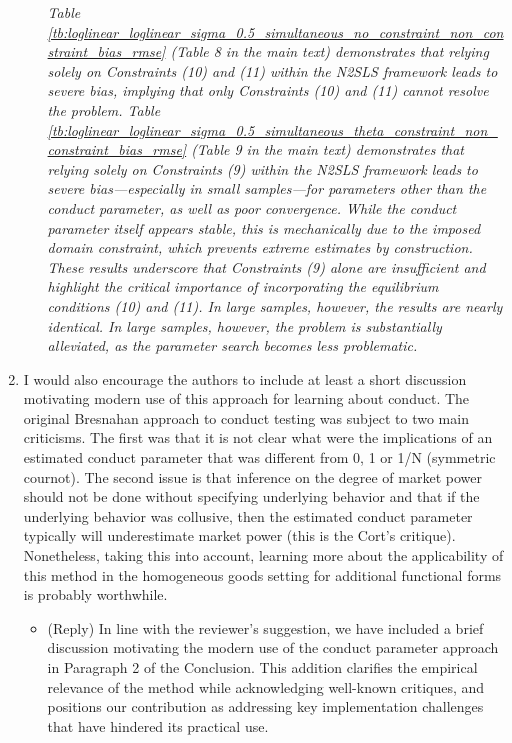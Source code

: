 \documentclass[11pt, a4paper]{article}
\theoremstyle{remark}
\begin{document}
\begin{enumerate}
\begin{itemize}
        \textit{Table \ref{tb:loglinear_loglinear_sigma_0.5_simultaneous_no_constraint_non_constraint_bias_rmse} (Table 8 in the main text) demonstrates that relying solely on Constraints (10) and (11) within the N2SLS framework leads to severe bias, implying that only Constraints (10) and (11) cannot resolve the problem. Table \ref{tb:loglinear_loglinear_sigma_0.5_simultaneous_theta_constraint_non_constraint_bias_rmse} (Table 9 in the main text) demonstrates that relying solely on Constraints (9) within the N2SLS framework leads to severe bias—especially in small samples—for parameters other than the conduct parameter, as well as poor convergence. While the conduct parameter itself appears stable, this is mechanically due to the imposed domain constraint, which prevents extreme estimates by construction. These results underscore that Constraints (9) alone are insufficient and highlight the critical importance of incorporating the equilibrium conditions (10) and (11). In large samples, however, the results are nearly identical. In large samples, however, the problem is substantially alleviated, as the parameter search becomes less problematic. }
    \end{itemize}
    \item I would also encourage the authors to include at least a short discussion motivating modern use of this approach for learning about conduct. The original Bresnahan approach to conduct testing was subject to two main criticisms. The first was that it is not clear what were the implications of an estimated conduct parameter that was different from 0, 1 or 1/N (symmetric cournot). The second issue is that inference on the degree of market power should not be done without specifying underlying behavior and that if the underlying behavior was collusive, then the estimated conduct parameter typically will underestimate market power (this is the Cort’s critique). Nonetheless, taking this into account, learning more about the applicability of this method in the homogeneous goods setting for additional functional forms is probably worthwhile.
    \begin{itemize}
        \item (Reply) In line with the reviewer’s suggestion, we have included a brief discussion motivating the modern use of the conduct parameter approach in Paragraph 2 of the Conclusion. This addition clarifies the empirical relevance of the method while acknowledging well-known critiques, and positions our contribution as addressing key implementation challenges that have hindered its practical use.
        

\end{itemize}
\end{enumerate}
\end{document}
